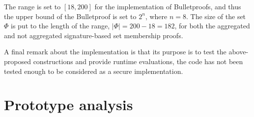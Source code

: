The range is set to $[18,200]$ for the implementation of Bulletproofs, and thus the upper bound of the Bulletproof is set to $2^n$, where $n=8$. The size of the set $\Phi$ is put to the length of the range, $|\Phi|=200-18 = 182$, for both the aggregated and not aggregated signature-based set membership proofs. 

A final remark about the implementation is that its purpose is to test the above-proposed constructions and provide runtime evaluations, the code has not been tested enough to be considered as a secure implementation.




\section{Prototype analysis}


